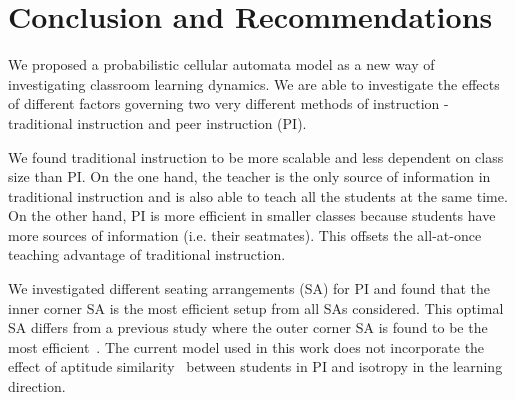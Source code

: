 \chapter{Conclusion and Recommendations}

We proposed a probabilistic cellular automata model as a new way of investigating classroom learning dynamics.
We are able to investigate the effects of different factors governing two very different methods of instruction - traditional instruction and peer instruction (PI).

We found traditional instruction to be more scalable and less dependent on class size than PI.
On the one hand, the teacher is the only source of information in traditional instruction and is also able to teach all the students at the same time.
On the other hand, PI is more efficient in smaller classes because students have more sources of information (i.e. their seatmates). 
This offsets the all-at-once teaching advantage of traditional instruction.

We investigated different seating arrangements (SA) for PI and found that the inner corner SA is the most efficient setup from all SAs considered.
This optimal SA differs from a previous study where the outer corner SA is found to be the most efficient~\cite{roxas2010seating}.
The current model used in this work does not incorporate the effect of aptitude similarity~\cite{smith2009peer} between students in PI and isotropy in the learning direction.

